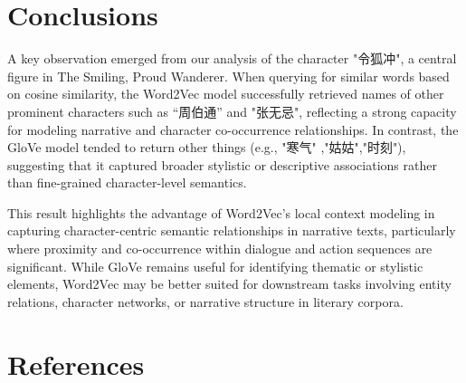 \documentclass[12pt]{article}
\begin{document}
\section*{\centering Conclusions}
A key observation emerged from our analysis of the character "令狐冲", a central figure in The Smiling, Proud Wanderer. When querying for similar words based on cosine similarity, the Word2Vec model successfully retrieved names of other prominent characters such as “周伯通” and "张无忌", reflecting a strong capacity for modeling narrative and character co-occurrence relationships. In contrast, the GloVe model tended to return other things (e.g., "寒气" ,"姑姑","时刻"), suggesting that it captured broader stylistic or descriptive associations rather than fine-grained character-level semantics.

This result highlights the advantage of Word2Vec's local context modeling in capturing character-centric semantic relationships in narrative texts, particularly where proximity and co-occurrence within dialogue and action sequences are significant. While GloVe remains useful for identifying thematic or stylistic elements, Word2Vec may be better suited for downstream tasks involving entity relations, character networks, or narrative structure in literary corpora.
\section*{\centering References}




\end{document}
